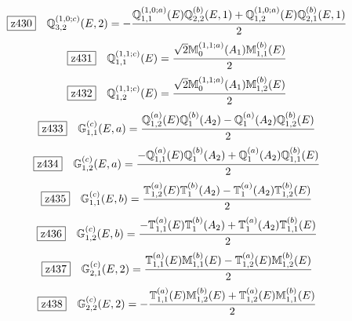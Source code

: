 \documentclass[fleqn,10pt,landscape]{jsarticle}
\begin{document}
\begin{dmath*}
\hspace*{3mm}\fbox{z430}\quad \mathbb{Q}_{3,2}^{(1,0;c)}(E,2)=- \frac{\mathbb{Q}_{1,1}^{(1,0;a)}(E) \mathbb{Q}_{2,2}^{(b)}(E,1) + \mathbb{Q}_{1,2}^{(1,0;a)}(E) \mathbb{Q}_{2,1}^{(b)}(E,1)}{2}
\end{dmath*}
\begin{dmath*}
\hspace*{3mm}\fbox{z431}\quad \mathbb{Q}_{1,1}^{(1,1;c)}(E)=\frac{\sqrt{2} \mathbb{M}_{0}^{(1,1;a)}(A_{1}) \mathbb{M}_{1,1}^{(b)}(E)}{2}
\end{dmath*}
\begin{dmath*}
\hspace*{3mm}\fbox{z432}\quad \mathbb{Q}_{1,2}^{(1,1;c)}(E)=\frac{\sqrt{2} \mathbb{M}_{0}^{(1,1;a)}(A_{1}) \mathbb{M}_{1,2}^{(b)}(E)}{2}
\end{dmath*}
\begin{dmath*}
\hspace*{3mm}\fbox{z433}\quad \mathbb{G}_{1,1}^{(c)}(E,a)=\frac{\mathbb{Q}_{1,2}^{(a)}(E) \mathbb{Q}_{1}^{(b)}(A_{2}) - \mathbb{Q}_{1}^{(a)}(A_{2}) \mathbb{Q}_{1,2}^{(b)}(E)}{2}
\end{dmath*}
\begin{dmath*}
\hspace*{3mm}\fbox{z434}\quad \mathbb{G}_{1,2}^{(c)}(E,a)=\frac{- \mathbb{Q}_{1,1}^{(a)}(E) \mathbb{Q}_{1}^{(b)}(A_{2}) + \mathbb{Q}_{1}^{(a)}(A_{2}) \mathbb{Q}_{1,1}^{(b)}(E)}{2}
\end{dmath*}
\begin{dmath*}
\hspace*{3mm}\fbox{z435}\quad \mathbb{G}_{1,1}^{(c)}(E,b)=\frac{\mathbb{T}_{1,2}^{(a)}(E) \mathbb{T}_{1}^{(b)}(A_{2}) - \mathbb{T}_{1}^{(a)}(A_{2}) \mathbb{T}_{1,2}^{(b)}(E)}{2}
\end{dmath*}
\begin{dmath*}
\hspace*{3mm}\fbox{z436}\quad \mathbb{G}_{1,2}^{(c)}(E,b)=\frac{- \mathbb{T}_{1,1}^{(a)}(E) \mathbb{T}_{1}^{(b)}(A_{2}) + \mathbb{T}_{1}^{(a)}(A_{2}) \mathbb{T}_{1,1}^{(b)}(E)}{2}
\end{dmath*}
\begin{dmath*}
\hspace*{3mm}\fbox{z437}\quad \mathbb{G}_{2,1}^{(c)}(E,2)=\frac{\mathbb{T}_{1,1}^{(a)}(E) \mathbb{M}_{1,1}^{(b)}(E) - \mathbb{T}_{1,2}^{(a)}(E) \mathbb{M}_{1,2}^{(b)}(E)}{2}
\end{dmath*}
\begin{dmath*}
\hspace*{3mm}\fbox{z438}\quad \mathbb{G}_{2,2}^{(c)}(E,2)=- \frac{\mathbb{T}_{1,1}^{(a)}(E) \mathbb{M}_{1,2}^{(b)}(E) + \mathbb{T}_{1,2}^{(a)}(E) \mathbb{M}_{1,1}^{(b)}(E)}{2}
\end{dmath*}
\end{document}
